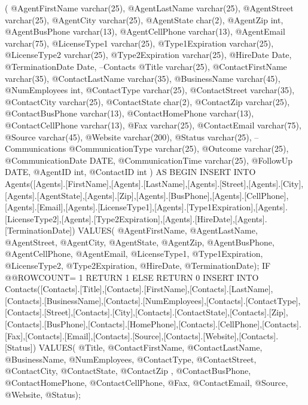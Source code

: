 (	
	@AgentFirstName varchar(25),
	@AgentLastName varchar(25),
	@AgentStreet varchar(25),
	@AgentCity varchar(25),
	@AgentState char(2),
	@AgentZip int,
	@AgentBusPhone varchar(13),
	@AgentCellPhone varchar(13),
	@AgentEmail varchar(75),
	@LicenseType1 varchar(25),
	@Type1Expiration varchar(25),
	@LicenseType2 varchar(25),
	@Type2Expiration varchar(25),
	@HireDate Date,
	@TerminationDate Date,
	--Contacts
	@Title varchar(25),
    @ContactFirstName varchar(35),
    @ContactLastName varchar(35),
    @BusinessName varchar(45),
    @NumEmployees int,
    @ContactType varchar(25),
    @ContactStreet varchar(35),
    @ContactCity varchar(25),
    @ContactState char(2),
    @ContactZip varchar(25),
    @ContactBusPhone varchar(13),
    @ContactHomePhone varchar(13),
    @ContactCellPhone varchar(13),
    @Fax varchar(25),
    @ContactEmail varchar(75),
    @Source varchar(45),
    @Website varchar(200),
    @Status varchar(25),
	--Communications
	@CommunicationType varchar(25),	
	@Outcome varchar(25),
	@CommunicationDate DATE,
	@CommunicationTime varchar(25),
	@FollowUp DATE,
	@AgentID int,
	@ContactID int
) AS BEGIN
INSERT INTO Agents([Agents].[FirstName],[Agents].[LastName],[Agents].[Street],[Agents].[City],[Agents].[AgentState],[Agents].[Zip],[Agents].[BusPhone],[Agents].[CellPhone],[Agents].[Email],[Agents].[LicenseType1],[Agents].[Type1Expiration],[Agents].[LicenseType2],[Agents].[Type2Expiration],[Agents].[HireDate],[Agents].[TerminationDate])			
	VALUES(		   @AgentFirstName,     @AgentLastName,     @AgentStreet,     @AgentCity,     @AgentState,          @AgentZip,     @AgentBusPhone,     @AgentCellPhone,     @AgentEmail,     @LicenseType1,          @Type1Expiration,          @LicenseType2,          @Type2Expiration,          @HireDate,          @TerminationDate);
	IF @@ROWCOUNT= 1
				RETURN 1
			ELSE
				RETURN 0
INSERT INTO Contacts([Contacts].[Title],[Contacts].[FirstName],[Contacts].[LastName],[Contacts].[BusinessName],[Contacts].[NumEmployees],[Contacts].[ContactType],[Contacts].[Street],[Contacts].[City],[Contacts].[ContactState],[Contacts].[Zip],[Contacts].[BusPhone],[Contacts].[HomePhone],[Contacts].[CellPhone],[Contacts].[Fax],[Contacts].[Email],[Contacts].[Source],[Contacts].[Website],[Contacts].[Status])	
	VALUES(			 @Title,	        @ContactFirstName,	   @ContactLastName,     @BusinessName,	           @NumEmployees,            @ContactType,            @ContactStreet,     @ContactCity,     @ContactState,            @ContactZip ,    @ContactBusPhone,     @ContactHomePhone,     @ContactCellPhone,     @Fax,            @ContactEmail,     @Source,            @Website,            @Status);        
